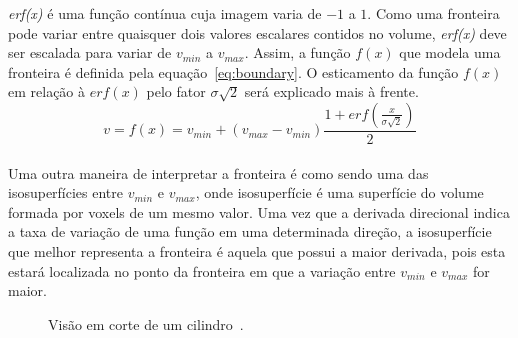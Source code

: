 	\textit{erf(x)} é uma função contínua cuja imagem varia de $-1$ a $1$. Como uma fronteira pode variar entre quaisquer dois valores escalares contidos no volume, \textit{erf(x)} deve ser escalada para variar de $v_{min}$ a $v_{max}$. Assim, a função $f(x)$ que modela uma fronteira é definida pela equação~\eqref{eq:boundary}. O esticamento da função $ f(x) $ em relação à $ erf(x) $ pelo fator $ \sigma\sqrt{2} $ será explicado mais à frente.
	\\

\begin{equation} \label{eq:boundary}
	v = f(x) = v_{min} + (v_{max} - v_{min}) \frac{1 + erf(\frac{x}{\sigma\sqrt{2}})}{2}
\end{equation} \\

	Uma outra maneira de interpretar a fronteira é como sendo uma das isosuperfícies entre $v_{min}$ e $v_{max}$, onde isosuperfície é uma superfície do volume formada por voxels de um mesmo valor. Uma vez que a derivada direcional indica a taxa de variação de uma função em uma determinada direção, a isosuperfície que melhor representa a fronteira é aquela que possui a maior derivada, pois esta estará localizada no ponto da fronteira em que a variação entre $v_{min}$ e $v_{max}$ for maior.
	
\begin{figure}[h]
	\centering
	\caption{Visão em corte de um cilindro~\cite{gordon}.}
	\label{fig:g_isosurfaces}
\end{figure}
	
